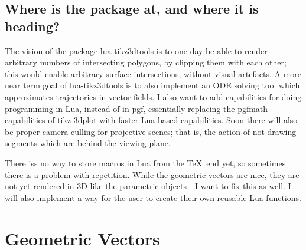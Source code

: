 \documentclass[12pt]{report}
\begin{document}
        \section{Where is the package at, and where it is heading?}
            The vision of the package lua-tikz3dtools is to one 
            day be able to render arbitrary numbers of intersecting 
            polygons, by clipping them with each other; this would 
            enable arbitrary surface intersections, without 
            visual artefacts. A more near term goal of 
            lua-tikz3dtools is to also implement an ODE 
            solving tool which approximates trajectories in 
            vector fields. I also want to add capabilities for 
            doing programming in Lua, instead of in pgf,
            essentially replacing the pgfmath capabilities of 
            tikz-3dplot with faster Lua-based capabilities.
            Soon there will also be proper camera culling for 
            projective scenes; that is, the action of not drawing 
            segments which are behind the viewing plane.\par 
            There iss no way  to store macros in Lua from the \TeX\      
            end yet, so sometimes there is a problem with 
            repetition. While the geometric vectors are nice,
            they are not yet rendered in 3D like the parametric 
            objects---I want to fix this as well.
            I will also implement a way for the user to create 
            their own reusable Lua functions.
    \chapter{Geometric Vectors}
\end{document}

